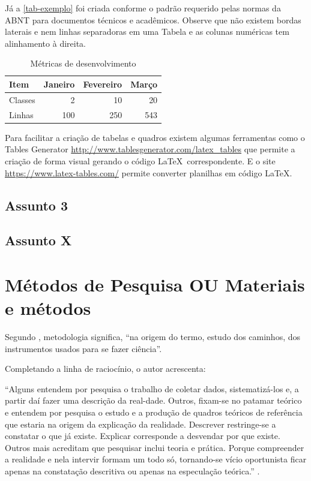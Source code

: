 \documentclass[
	article,			%
	12pt,				%
	oneside,			%
	a4paper,			%
    BIBLATEX,           %
	english,			%
	brazil,				%
	sumario=tradicional
	]{abntex2}
\begin{document}
Já a \autoref{tab-exemplo} foi criada conforme o padrão  requerido pelas normas da ABNT para documentos técnicos e acadêmicos. Observe que não existem bordas laterais e nem linhas separadoras em uma Tabela e as colunas numéricas tem alinhamento à direita. 

\begin{table}[htb]
\centering
\caption{Métricas de desenvolvimento}
\label{tab-exemplo}
\begin{tabular}{p{2.6cm}rrr}
    \hline
    \textbf{Item} & \textbf{Janeiro} & \textbf{Fevereiro} & \textbf{Março} \\
    \hline
    \hline
    Classes & 2  & 10 & 20  \\
    Linhas & 100  & 250 & 543 \\
    \hline
\end{tabular}
\end{table}

Para facilitar a criação de tabelas e quadros existem algumas ferramentas como o Tables Generator \url{http://www.tablesgenerator.com/latex_tables} que permite a criação de forma visual gerando o código \LaTeX\ correspondente. E o site \url{https://www.latex-tables.com/} permite converter planilhas em código \LaTeX.

\subsection{Assunto 3}
\lipsum[1]
\subsection{Assunto X}
\lipsum[1]


\section{Métodos de Pesquisa OU Materiais e métodos}

Segundo , metodologia significa, “na origem do termo, estudo dos caminhos, dos instrumentos usados para se fazer ciência”.

Completando a linha de raciocínio, o autor acrescenta:

    \begin{citacao}
    “Alguns entendem por pesquisa o trabalho de coletar dados, sistematizá-los e, a partir daí fazer uma descrição da real-dade. Outros, fixam-se no patamar teórico e entendem por pesquisa o estudo e a produção de quadros teóricos de referência que estaria na origem da explicação da realidade. Descrever restringe-se a constatar o que já existe. Explicar corresponde a desvendar por que existe. Outros mais acreditam que pesquisar inclui teoria e prática. Porque compreender a realidade e nela intervir formam um todo só, tornando-se vício oportunista ficar apenas na constatação descritiva ou apenas na especulação teórica.”
    \lipsum[5] \cite{PESQUISA:DEMO}.
    \end{citacao}
\end{document}
